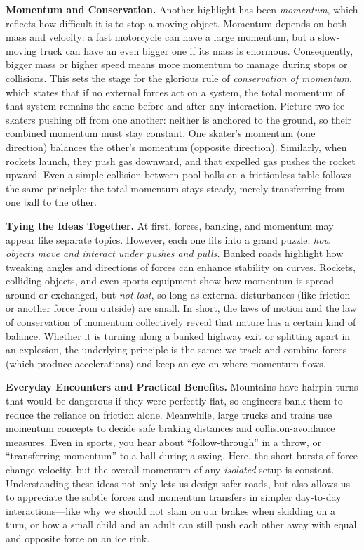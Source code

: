 \documentclass[12pt]{article}
\begin{document}
\vspace{0.5em}
\noindent
\textbf{Momentum and Conservation.} Another highlight has been \emph{momentum}, which reflects how difficult it is to stop a moving object. Momentum depends on both mass and velocity: a fast motorcycle can have a large momentum, but a slow-moving truck can have an even bigger one if its mass is enormous. Consequently, bigger mass or higher speed means more momentum to manage during stops or collisions. This sets the stage for the glorious rule of \emph{conservation of momentum}, which states that if no external forces act on a system, the total momentum of that system remains the same before and after any interaction. Picture two ice skaters pushing off from one another: neither is anchored to the ground, so their combined momentum must stay constant. One skater’s momentum (one direction) balances the other’s momentum (opposite direction). Similarly, when rockets launch, they push gas downward, and that expelled gas pushes the rocket upward. Even a simple collision between pool balls on a frictionless table follows the same principle: the total momentum stays steady, merely transferring from one ball to the other. 

\vspace{0.5em}
\noindent
\textbf{Tying the Ideas Together.} At first, forces, banking, and momentum may appear like separate topics. However, each one fits into a grand puzzle: \emph{how objects move and interact under pushes and pulls.} Banked roads highlight how tweaking angles and directions of forces can enhance stability on curves. Rockets, colliding objects, and even sports equipment show how momentum is spread around or exchanged, but \emph{not lost}, so long as external disturbances (like friction or another force from outside) are small. In short, the laws of motion and the law of conservation of momentum collectively reveal that nature has a certain kind of balance. Whether it is turning along a banked highway exit or splitting apart in an explosion, the underlying principle is the same: we track and combine forces (which produce accelerations) and keep an eye on where momentum flows.  

\vspace{0.5em}
\noindent
\textbf{Everyday Encounters and Practical Benefits.} Mountains have hairpin turns that would be dangerous if they were perfectly flat, so engineers bank them to reduce the reliance on friction alone. Meanwhile, large trucks and trains use momentum concepts to decide safe braking distances and collision-avoidance measures. Even in sports, you hear about “follow-through” in a throw, or “transferring momentum” to a ball during a swing. Here, the short bursts of force change velocity, but the overall momentum of any \emph{isolated} setup is constant. Understanding these ideas not only lets us design safer roads, but also allows us to appreciate the subtle forces and momentum transfers in simpler day-to-day interactions---like why we should not slam on our brakes when skidding on a turn, or how a small child and an adult can still push each other away with equal and opposite force on an ice rink. 
\end{document}
